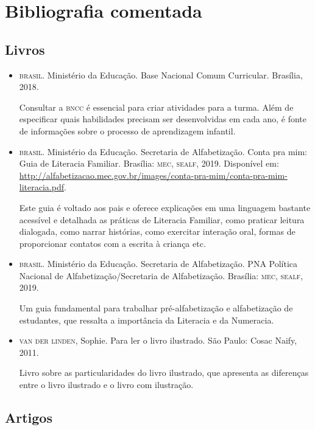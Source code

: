 \documentclass[11pt]{extarticle}
\begin{document}
\section{Bibliografia comentada}

\subsection{Livros}

\begin{itemize}
\item \textsc{brasil}. Ministério da Educação. Base Nacional Comum Curricular. Brasília, 2018.

Consultar a \textsc{bncc} é essencial para criar atividades para a turma. Além de especificar 
quais habilidades precisam ser desenvolvidas em cada ano, é fonte de informações sobre 
o processo de aprendizagem infantil. 

\item \textsc{brasil}. Ministério da Educação. Secretaria de Alfabetização. Conta pra mim: Guia de Literacia Familiar. 
Brasília: \textsc{mec, sealf}, 2019. Disponível em: \url{http://alfabetizacao.mec.gov.br/images/conta-pra-mim/conta-pra-mim-literacia.pdf}.

Este guia é voltado aos pais e oferece explicações em uma linguagem bastante acessível e detalhada as práticas de Literacia Familiar, 
como praticar leitura dialogada, como narrar histórias, como exercitar interação oral, formas de proporcionar contatos com a escrita à criança etc. 
 
\item \textsc{brasil}. Ministério da Educação. Secretaria de Alfabetização. PNA Política Nacional de Alfabetização/Secretaria 
de Alfabetização. Brasília: \textsc{mec, sealf}, 2019.

Um guia fundamental para trabalhar pré-alfabetização e alfabetização de estudantes, que ressalta a importância da Literacia e da Numeracia. 

\item \textsc{van der linden}, Sophie. Para ler o livro ilustrado. São Paulo: Cosac Naify, 2011.

Livro sobre as particularidades do livro ilustrado, que apresenta as diferenças entre o livro ilustrado e o livro com ilustração. 
\end{itemize}

\subsection{Artigos}
\end{document}

